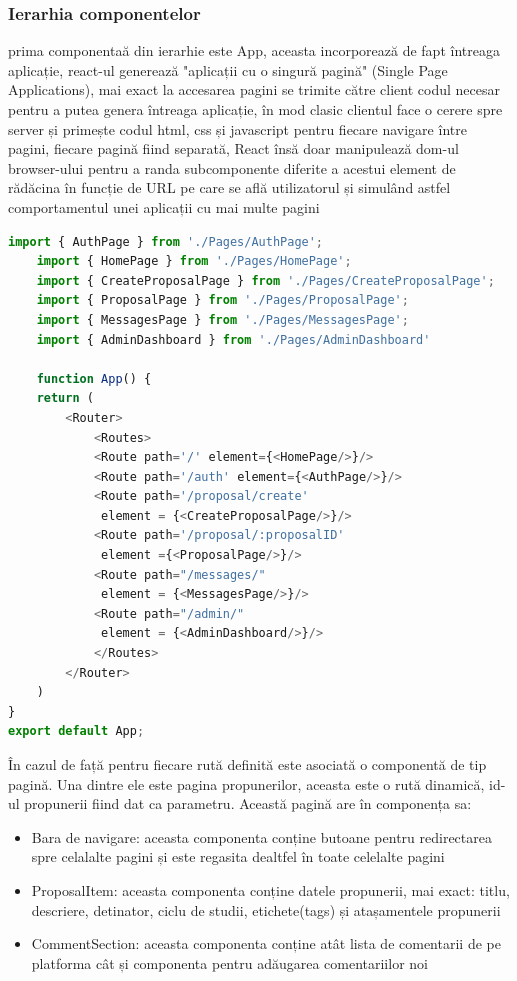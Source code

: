 \documentclass[12pt,a4paper,hidelinks]{report}
\theoremstyle{definition}
\theoremstyle{remark}
\begin{document}
\subsubsection{Ierarhia componentelor}
prima componentaă din ierarhie este App, aceasta incorporează de fapt întreaga aplicație, react-ul generează "aplicații cu o singură pagină" (Single Page Applications),
mai exact la accesarea pagini se trimite către client codul necesar pentru a putea genera întreaga aplicație, în mod clasic clientul
face o cerere spre server și primește codul html, css și javascript pentru fiecare navigare între pagini, fiecare pagină fiind separată, React însă
doar manipulează dom-ul browser-ului pentru a randa subcomponente diferite a acestui element de rădăcina în funcție de URL pe care se află utilizatorul și simulând 
astfel comportamentul unei aplicații cu mai multe pagini
\begin{lstlisting}[language=Javascript]
    import { AuthPage } from './Pages/AuthPage';
    import { HomePage } from './Pages/HomePage';
    import { CreateProposalPage } from './Pages/CreateProposalPage';
    import { ProposalPage } from './Pages/ProposalPage';
    import { MessagesPage } from './Pages/MessagesPage';
    import { AdminDashboard } from './Pages/AdminDashboard'

    function App() {
    return (
        <Router>
            <Routes>
            <Route path='/' element={<HomePage/>}/>
            <Route path='/auth' element={<AuthPage/>}/>
            <Route path='/proposal/create'
             element = {<CreateProposalPage/>}/>
            <Route path='/proposal/:proposalID'
             element ={<ProposalPage/>}/>
            <Route path="/messages/"
             element = {<MessagesPage/>}/>
            <Route path="/admin/"
             element = {<AdminDashboard/>}/>
            </Routes>
        </Router>
    )
}
export default App;   
\end{lstlisting}
În cazul de față pentru fiecare rută definită este asociată o componentă de tip pagină.
Una dintre ele este pagina propunerilor, aceasta este o rută dinamică, id-ul propunerii fiind dat ca parametru.
Această pagină are în componența sa:
\begin{itemize}
    \item Bara de navigare: aceasta componenta conține butoane pentru redirectarea spre celalalte pagini și este regasita dealtfel în toate celelalte pagini
    \item ProposalItem: aceasta componenta conține datele propunerii, mai exact: titlu, descriere, detinator, ciclu de studii, etichete(tags) și atașamentele propunerii
    \item CommentSection: aceasta componenta conține atât lista de comentarii de pe platforma cât și componenta pentru adăugarea comentariilor noi
\end{itemize}
\end{document}

